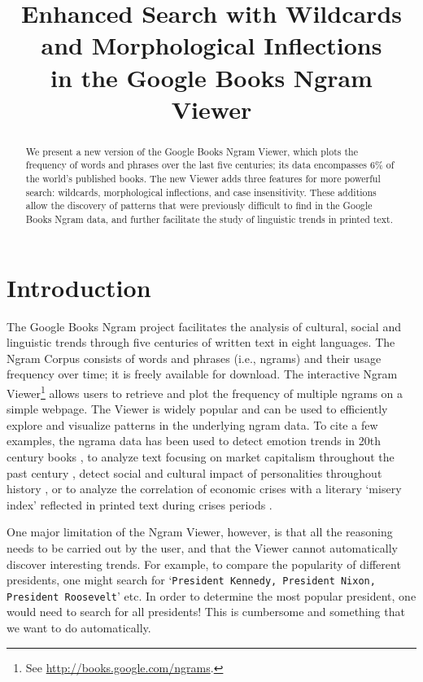 \documentclass[11pt]{article}
\title{Enhanced Search with Wildcards and Morphological Inflections\\in the Google Books Ngram Viewer}
\date{}
\begin{document}
\maketitle

\begin{abstract}

We present a new version of the Google Books Ngram Viewer, which plots
the frequency of words and phrases over the last five
centuries; its data encompasses 6\% of the world's published books.
The new Viewer adds three features for more powerful search: wildcards,
morphological inflections, and case insensitivity. These additions allow
the discovery of patterns that were previously difficult to find in the Google Books Ngram data,
and further facilitate the study of linguistic trends in printed text.

\end{abstract}

\section{Introduction}

The Google Books Ngram project facilitates the analysis of cultural, social and linguistic trends through five centuries of written text in eight languages. The Ngram Corpus \cite{culturomics,lin2012syntactic} consists of words and phrases (i.e., ngrams) and their usage frequency over time; it is freely available for download. The interactive Ngram Viewer\footnote{See \url{http://books.google.com/ngrams}.} allows users to retrieve and plot the frequency of multiple ngrams on a simple webpage. The Viewer is widely popular and can be used to efficiently explore and visualize patterns in the underlying ngram data. To cite a few examples, the ngrama data has been used to detect emotion trends in 20th century books \cite{acerbi.etal.2013}, to analyze text focusing on market capitalism throughout the past century \cite{Schulz2013}, detect social and cultural impact of personalities throughout history \cite{skiena.ward.2013}, or to analyze the correlation of economic crises with a literary `misery index' reflected in printed text during crises periods \cite{bentley.et.al.2014}.

One major limitation of the Ngram Viewer, however, is that all the reasoning needs to be carried out by the user, and that the Viewer cannot automatically discover interesting trends. For example, to compare the popularity of different presidents, one might search for `\texttt{President Kennedy, President Nixon, President Roosevelt}' etc. In order to determine the most popular president, one would need to search for all presidents! This is cumbersome and something that we want to do automatically.
\end{document}
